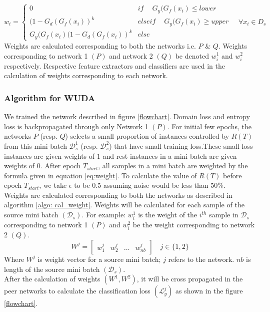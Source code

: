 \begin{equation}
\label{eq:weight}
                w_{i} = \begin{cases}
		            0 & if\ \quad G_y(G_f(x_i) \le lower \\
		            (1 - G_d(G_f(x_i))^k & elseif\ \quad G_y(G_f(x_i) \ge upper \\
		            G_y(G_f(x_i)(1 - G_d(G_f(x_i))^k & else\ 
		            \end{cases} \quad \forall x_i \in D_s
\end{equation}
Weights are calculated corresponding to both the networks i.e. $P$ \& $Q$. Weights corresponding to network 1 $(P)$ and network 2 $(Q)$ be denoted $w_{i}^1$ and $w_{i}^2$ respectively. Respective feature extractors and classifiers are used in the calculation of weights corresponding to each network.  

\subsubsection{Algorithm for WUDA}
We trained the network described in figure \ref{flowchart}. Domain loss and entropy loss is backpropagated through only Network 1 $(P)$. For initial few epochs, the networks $P$ (resp. $Q$) selects a small proportion of instances controlled by $R(T)$ from this mini-batch $\mathcal{D}_{s}^1$ (resp. $\mathcal{D}_{s}^2$) that have small training loss.These small loss instances are given weights of $1$ and rest instances in a mini batch are given weights of $0$. After epoch $T_{start}$, all samples in a mini batch are weighted by the formula given in equation \ref{eq:weight}. To calculate the value of $R(T)$ before epoch $T_{start}$, we take $\epsilon$ to be $0.5$ assuming noise would be less than $50\%$.\\
Weights are calculated corresponding to both the networks as described in algorithm \ref{algo: cal_weight}. Weights will be calculated for each sample of the source mini batch $(\mathcal{D}_s)$. For example: $w_{i}^1$ is the weight of the $i^{th}$ sample in $\mathcal{D}_s$ corresponding to network 1 $(P)$ and $w_{i}^2$ be the weight corresponding to network 2 $(Q)$.
\begin{equation}
    W^j = \begin{bmatrix} w_{1}^j & w_{2}^j & \dots & w_{nb}^j \end{bmatrix}  \quad j \in \{1, 2\}
\end{equation}
Where $W^j$ is weight vector for a source mini batch; $j$ refers to the network. $nb$ is length of the source mini batch $(\mathcal{D}_s)$.\\
After the calculation of weights $(W^1, W^2)$, it will be cross propagated in the peer networks to calculate the classification loss $(\mathcal{L}_{y}^j)$ as shown in the figure \ref{flowchart}.

